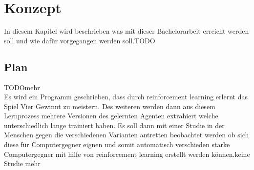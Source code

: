 \chapter{Konzept}%
       

\label{cha:Konzept}

In diesem Kapitel wird beschrieben was mit dieser Bachelorarbeit erreicht werden soll und wie dafür vorgegangen werden soll.\colorbox{red!30}{TODO}


\section{Plan}
\colorbox{red!30}{TODO}mehr\\
Es wird ein Programm geschrieben, dass durch reinforcement learning erlernt das Spiel Vier Gewinnt zu meistern. Des weiteren werden dann aus diesem Lernprozess mehrere Versionen des gelernten Agenten extrahiert welche  unterschiedlich lange trainiert haben. Es soll dann mit einer Studie in der Menschen gegen die verschiedenen Varianten antretten beobachtet werden ob sich diese für Computergegner eignen und somit automatisch verschieden starke Computergegner mit hilfe von reinforcement learning erstellt werden können.\colorbox{red!30}{keine Studie mehr}
